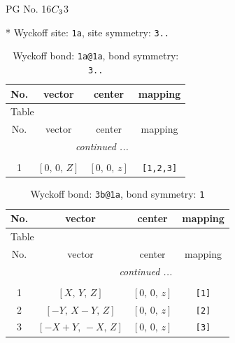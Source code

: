 \documentclass[fleqn,8pt]{jsarticle}
\begin{document}
\setcounter{MaxMatrixCols}{32}

\renewcommand{\tablename}{Table~}
\renewcommand{\figurename}{Figure~}
\begin{center}
\LARGE
PG No. 16\quad$C_{\rm 3}$\quad$3$\quad[ trigonal ]
\end{center}


* Wyckoff site: {\tt 1a}, site symmetry: {\tt 3..}
\renewcommand{\arraystretch}{1.2}
\begin{longtable}{cccc}
\caption{Wyckoff bond: {\tt 1a@1a}, bond symmetry: {\tt 3..}}
 \\
 \hline \hline
No. & vector & center & mapping \\ \hline \endfirsthead

\multicolumn{3}{l}{\tablename\ \thetable{}} \\
 \hline \hline
No. & vector & center & mapping \\ \hline \endhead

 \hline \hline
\multicolumn{3}{r}{\footnotesize\it continued ...} \\ \endfoot

 \hline \hline
\multicolumn{3}{r}{} \\ \endlastfoot

1 & $\left[ 0,\, 0,\, Z \right]$ & $\left[ 0,\, 0,\, z \right]$ & {\tt [1,2,3]} \\
\end{longtable}
\renewcommand{\arraystretch}{1.2}
\begin{longtable}{cccc}
\caption{Wyckoff bond: {\tt 3b@1a}, bond symmetry: {\tt 1}}
 \\
 \hline \hline
No. & vector & center & mapping \\ \hline \endfirsthead

\multicolumn{3}{l}{\tablename\ \thetable{}} \\
 \hline \hline
No. & vector & center & mapping \\ \hline \endhead

 \hline \hline
\multicolumn{3}{r}{\footnotesize\it continued ...} \\ \endfoot

 \hline \hline
\multicolumn{3}{r}{} \\ \endlastfoot

1 & $\left[ X,\, Y,\, Z \right]$ & $\left[ 0,\, 0,\, z \right]$ & {\tt [1]} \\ \hline
2 & $\left[ - Y,\, X - Y,\, Z \right]$ & $\left[ 0,\, 0,\, z \right]$ & {\tt [2]} \\ \hline
3 & $\left[ - X + Y,\, - X,\, Z \right]$ & $\left[ 0,\, 0,\, z \right]$ & {\tt [3]} \\
\end{longtable}
\end{document}
